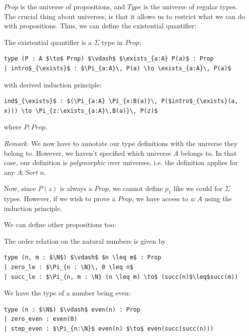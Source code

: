 \documentclass[a4paper, 12pt]{article}
\newcommand{\N}{\mathbb{N}}
\newcommand{\B}{\mathbb{B}}
\newcommand{\Prop}{\mathit{Prop}}
\newcommand{\Type}{\mathit{Type}}
\newcommand{\Sort}{\mathit{Sort\;}}
\renewcommand{\Prop}{\mathit{Prop}}
\theoremstyle{changedot}
\theoremstyle{changedotbreak}
\theoremstyle{nonumberplain}
\begin{document}
$\Prop$ is the universe of propositions, and $\Type$ is the universe of regular types. The crucial thing about universes, is that it allows us to restrict what we can do with propositions. Thus, we can define the existential quantifier:

\begin{definition}
  The existential quantifier is a $\Sigma$ type in $\Prop$:
\begin{lstlisting}
type (P : A $\to$ Prop) $\vdash$ $\exists_{a:A} P(a)$ : Prop
| intro$_{\exists}$ : $\Pi_{a:A}\, P(a) \to \exists_{a:A}\, P(a)$
\end{lstlisting}
  with derived induction principle:
\begin{lstlisting}
ind$_{\exists}$ : $(\Pi_{a:A} \Pi_{x:B(a)}\, P($intro$_{\exists}(a, x))) \to \Pi_{z:\exists_{a:A}\,B(a)}\, P(z)$
\end{lstlisting}
  where $P : \Prop$. 
\end{definition}
\textit{Remark.} We now have to annotate our type definitions with the universe they belong to. However, we haven't specified which universe $A$ belongs to. In that case, our definition is \textit{polymorphic} over universes, i.e. the definition applies for any $A : \Sort n$.

Now, since $P(z)$ is always a $\Prop$, we cannot define $p_{1}$ like we could for $\Sigma$ types. However, if we wish to prove a $\Prop$, we have access to $a:A$ using the induction principle.

We can define other propositions too:

\begin{definition}
  The order relation on the natural numbers is given by
\begin{lstlisting}
type (n, m : $\N$) $\vdash$ $n \leq m$ : Prop
| zero_le : $\Pi_{n : \N}\, 0 \leq n$
| succ_le : $\Pi_{n, m : \N} (n \leq m) \to$ (succ(n)$\leq$succ(m))
\end{lstlisting}
\end{definition}

\begin{definition}
  We have the type of a number being even:
\begin{lstlisting}
type (n : $\N$) $\vdash$ even(n) : Prop
| zero_even : even(0)
| step_even : $\Pi_{n:\N}$ even(n) $\to$ even(succ(succ(n)))
\end{lstlisting}
\end{definition}

\end{document}
